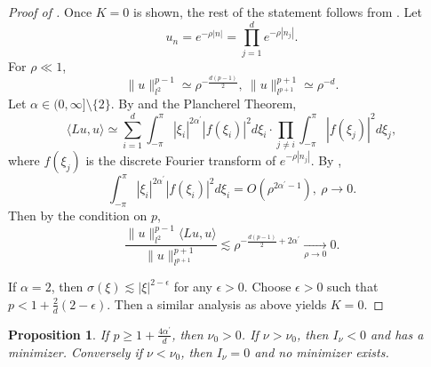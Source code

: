 \documentclass{article}
\numberwithin{equation}{section}
\newtheorem{proposition}{Proposition}[section]
\begin{document}
\begin{proof}[Proof of ]
Once $K=0$ is shown, the rest of the statement follows from . Let
\begin{equation*}
u_n = e^{-\rho |n|} = \prod\limits_{j=1}^d e^{-\rho |n_j|}.    
\end{equation*}
For $\rho \ll 1$,
\begin{equation*}
\| u \|_{l^2}^{p-1} \simeq  \rho^{-\frac{d(p-1)}{2}},\ \| u \|_{l^{p+1}}^{p+1} \simeq \rho^{-d}.    
\end{equation*}
Let $\alpha \in (0,\infty] \setminus \{2\}$. By  and the Plancherel Theorem,
\begin{equation*}
    \langle Lu,u \rangle \simeq \sum_{i=1}^d \int_{-\pi}^{\pi} |\xi_i|^{2\alpha^\prime} |f(\xi_i)|^2 d\xi_i \cdot \prod_{j \neq i} \int_{-\pi}^{\pi} |f(\xi_j)|^2 d\xi_j,
\end{equation*}
where $f(\xi_j)$ is the discrete Fourier transform of $e^{-\rho |n_j|}$. By ,
\begin{equation}
    \int_{-\pi}^{\pi} |\xi_i|^{2\alpha^\prime} |f(\xi_i)|^2 d\xi_i = O(\rho^{2\alpha^\prime - 1}),\ \rho \rightarrow 0.
\end{equation}
Then by the condition on $p$,
\begin{equation*}
    \frac{\| u \|_{l^2}^{p-1}\langle Lu,u \rangle}{\| u \|_{l^{p+1}}^{p+1}} \lesssim \rho^{-\frac{d(p-1)}{2} + 2\alpha^\prime} \xrightarrow[\rho \rightarrow 0]{} 0.
\end{equation*}

If $\alpha = 2$, then $\sigma(\xi) \lesssim |\xi|^{2-\epsilon}$ for any $\epsilon > 0$. Choose $\epsilon > 0$ such that $p < 1 + \frac{2}{d}(2-\epsilon)$. Then a similar analysis as above yields $K = 0$.
\end{proof}

\begin{proposition}\label{p1}
If $p \geq 1 + \frac{4\alpha^\prime}{d}$, then $\nu_0 > 0$. If $\nu > \nu_0$, then $I_\nu < 0$ and has a minimizer. Conversely if $\nu < \nu_0$, then $I_\nu = 0$ and no minimizer exists.
\end{proposition}
\end{document}
